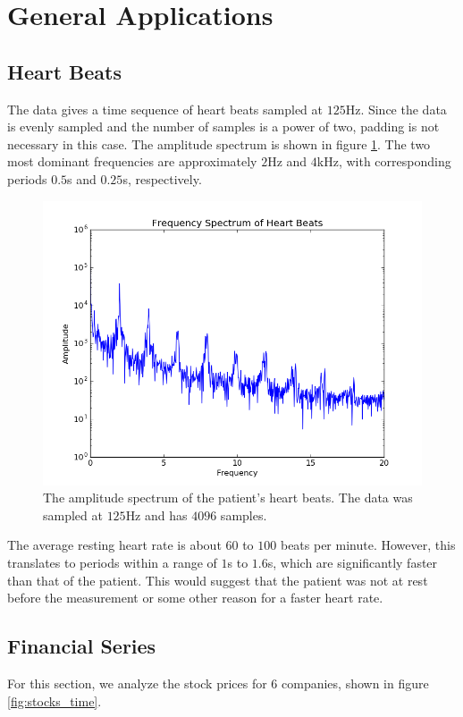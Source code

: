 \message{ !name(austin_report.tex)}\documentclass[11pt, letterpage, twocolumn]{article}
\begin{document}
\section{General Applications}

\subsection{Heart Beats}
The data gives a time sequence of heart beats sampled at $125$Hz. Since the data
is evenly sampled and the number of samples is a power of two, padding is not
necessary in this case. The amplitude spectrum is shown in figure
\ref{fig:beats}. The two most dominant frequencies are approximately $2$Hz and
$4$kHz, with corresponding periods $0.5$s and $0.25$s, respectively.

\begin{figure}
  \includegraphics[width=\linewidth]{beats.png}
  \caption{
    The amplitude spectrum of the patient's heart beats. The data was sampled at
    $125$Hz and has $4096$ samples.
  }
  \label{fig:beats}
\end{figure}

The average resting heart rate is about $60$ to $100$ beats per minute. However,
this translates to periods within a range of $1$s to $1.6$s, which are
significantly faster than that of the patient. This would suggest that the
patient was not at rest before the measurement or some other reason for a faster
heart rate.

\subsection{Financial Series}
For this section, we analyze the stock prices for 6 companies, shown in figure
\ref{fig:stocks_time}.
\end{document}
